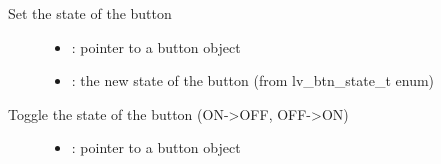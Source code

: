 \documentclass[letterpaper,10pt,english]{sphinxmanual}
\begin{document}
\begin{fulllineitems}
\label{\detokenize{object-types/btn:_CPPv416lv_btn_set_stateP8lv_obj_t14lv_btn_state_t}}%
\pysigstartmultiline
{}\label{\detokenize{object-types/btn:lv__btn_8h_1ac9f0f3f344ff91e547491c93293ac591}}%
\pysigstopmultiline
Set the state of the button \begin{description}
\item[{}] \leavevmode\begin{itemize}
\item {} 
: pointer to a button object 

\item {} 
: the new state of the button (from lv\_btn\_state\_t enum) 

\end{itemize}

\end{description}


\end{fulllineitems}


\begin{fulllineitems}
\label{\detokenize{object-types/btn:_CPPv413lv_btn_toggleP8lv_obj_t}}%
\pysigstartmultiline
{}\label{\detokenize{object-types/btn:lv__btn_8h_1a906c44ebe25f1d8a6edbb528b03b5c89}}%
\pysigstopmultiline
Toggle the state of the button (ON-\textgreater{}OFF, OFF-\textgreater{}ON) \begin{description}
\item[{}] \leavevmode\begin{itemize}
\item {} 
: pointer to a button object 

\end{itemize}

\end{description}


\end{fulllineitems}
\end{document}
